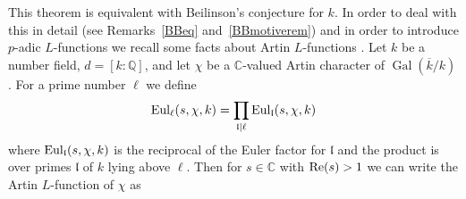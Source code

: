 \documentclass{amsart}
\begin{document}
This theorem is equivalent with Beilinson's conjecture for $ k $.
In order to deal with this in detail 
(see Remarks~\ref{BBeq} and~\ref{BBmotiverem}) and in order to introduce {$p$-adic{\futurelet{}}} {$L$-functions{\futurelet{}}} 
we recall some facts about Artin {$L$-functions{\futurelet{}}} \cite[Chapter VII, \S~10-12]{Neu99}.
Let $ k $ be a number field, $ d = [k:{\mathbb Q}] $, 
and let $ \chi $ be a $ {\mathbb C} $-valued Artin character of $ {\operatorname{Gal}}({\overline{k}}/k) $.
For a prime number $ \ell $ we define 
\[
{\textup{Eul}}_\ell(s, \chi, k) =  \prod_{\mathfrak{l} \mid \ell} {\textup{Eul}}_{\mathfrak l}(s,\chi,k)
\]
where $ {\textup{Eul}}_{\mathfrak l}(s,\chi,k) $ is the reciprocal of the Euler factor for $ \mathfrak l $
and the product is over primes $ \mathfrak l $ of $ k $ lying above $ \ell $.  Then for $ s \in {\mathbb C} $
with $ {\textup{Re}}(s)>1 $ we can write the Artin {$L$-function{\futurelet{}}} of $ \chi $ as
\end{document}

